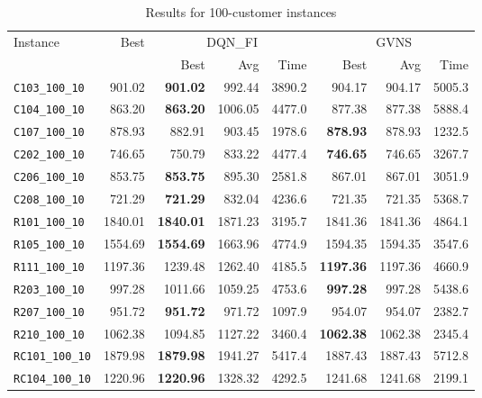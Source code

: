\begin{table}[ht]
\centering
\small
\setlength{\tabcolsep}{5pt}
\caption{Results for 100-customer instances}
\vspace{4mm}
\begin{adjustbox}{width=\textwidth}
\begin{tabular}{l r r r r @{\hspace{8pt}} r r r @{\hspace{8pt}}}
\toprule
\multirow{2}{*}{Instance} & \multirow{2}{*}{Best} & \multicolumn{3}{c}{DQN\_FI} & \multicolumn{3}{c}{GVNS} \\
\cmidrule(lr){3-5} \cmidrule(lr){6-8}
 &  & Best & Avg & Time & Best & Avg & Time \\
\midrule
\texttt{C103\_100\_10} & 901.02 & \textbf{901.02} & 992.44 & 3890.2 & 904.17 & 904.17 & 5005.3 \\
\texttt{C104\_100\_10} & 863.20 & \textbf{863.20} & 1006.05 & 4477.0 & 877.38 & 877.38 & 5888.4 \\
\texttt{C107\_100\_10} & 878.93 & 882.91 & 903.45 & 1978.6 & \textbf{878.93} & 878.93 & 1232.5 \\
\texttt{C202\_100\_10} & 746.65 & 750.79 & 833.22 & 4477.4 & \textbf{746.65} & 746.65 & 3267.7 \\
\texttt{C206\_100\_10} & 853.75 & \textbf{853.75} & 895.30 & 2581.8 & 867.01 & 867.01 & 3051.9 \\
\texttt{C208\_100\_10} & 721.29 & \textbf{721.29} & 832.04 & 4236.6 & 721.35 & 721.35 & 5368.7 \\
\texttt{R101\_100\_10} & 1840.01 & \textbf{1840.01} & 1871.23 & 3195.7 & 1841.36 & 1841.36 & 4864.1 \\
\texttt{R105\_100\_10} & 1554.69 & \textbf{1554.69} & 1663.96 & 4774.9 & 1594.35 & 1594.35 & 3547.6 \\
\texttt{R111\_100\_10} & 1197.36 & 1239.48 & 1262.40 & 4185.5 & \textbf{1197.36} & 1197.36 & 4660.9 \\
\texttt{R203\_100\_10} & 997.28 & 1011.66 & 1059.25 & 4753.6 & \textbf{997.28} & 997.28 & 5438.6 \\
\texttt{R207\_100\_10} & 951.72 & \textbf{951.72} & 971.72 & 1097.9 & 954.07 & 954.07 & 2382.7 \\
\texttt{R210\_100\_10} & 1062.38 & 1094.85 & 1127.22 & 3460.4 & \textbf{1062.38} & 1062.38 & 2345.4 \\
\texttt{RC101\_100\_10} & 1879.98 & \textbf{1879.98} & 1941.27 & 5417.4 & 1887.43 & 1887.43 & 5712.8 \\
\texttt{RC104\_100\_10} & 1220.96 & \textbf{1220.96} & 1328.32 & 4292.5 & 1241.68 & 1241.68 & 2199.1 \\

\end{tabular}
\end{adjustbox}
\end{table}
